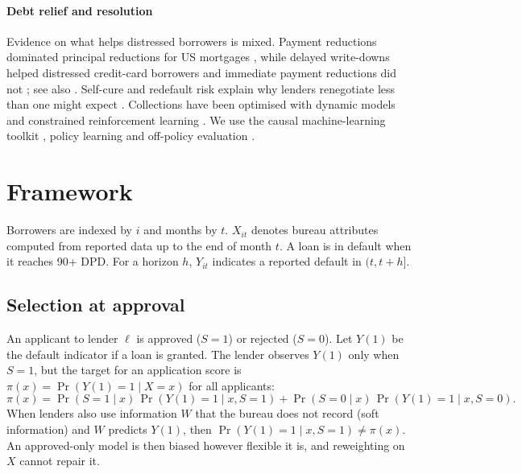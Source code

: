 \documentclass[10pt]{article}
\begin{document}
\paragraph{Debt relief and resolution} Evidence on what helps distressed borrowers is mixed. Payment reductions dominated principal reductions for US mortgages \citep{ganong2020}, while delayed write-downs helped distressed credit-card borrowers and immediate payment reductions did not \citep{dobbie2020targeted}; see also \citet{dobbie2015,agarwal2017,piskorski2010}. Self-cure and redefault risk explain why lenders renegotiate less than one might expect \citep{adelino2013}. Collections have been optimised with dynamic models \citep{chehrazi2019} and constrained reinforcement learning \citep{abe2010}. We use the causal machine-learning toolkit \citep{chernozhukov2018,wager2018,athey2019grf,kunzel2019,nie2021,kennedy2023}, policy learning \citep{kitagawa2018,athey2021} and off-policy evaluation \citep{dudik2011}.

\section{Framework}\label{sec:framework}

Borrowers are indexed by $i$ and months by $t$. $X_{it}$ denotes bureau attributes computed from reported data up to the end of month $t$. A loan is in default when it reaches 90+ DPD. For a horizon $h$, $Y_{it}$ indicates a reported default in $(t, t+h]$.

\subsection{Selection at approval}\label{sec:selection}

An applicant to lender $\ell$ is approved ($S=1$) or rejected ($S=0$). Let $Y(1)$ be the default indicator if a loan is granted. The lender observes $Y(1)$ only when $S=1$, but the target for an application score is $\pi(x) = \Pr(Y(1)=1 \mid X=x)$ for all applicants:
\begin{equation}\label{eq:decomp}
\pi(x) = \Pr(S=1 \mid x)\,\Pr(Y(1)=1 \mid x, S=1) + \Pr(S=0 \mid x)\,\Pr(Y(1)=1 \mid x, S=0).
\end{equation}
When lenders also use information $W$ that the bureau does not record (soft information) and $W$ predicts $Y(1)$, then $\Pr(Y(1)=1\mid x,S=1) \neq \pi(x)$. An approved-only model is then biased however flexible it is, and reweighting on $X$ cannot repair it.
\end{document}
